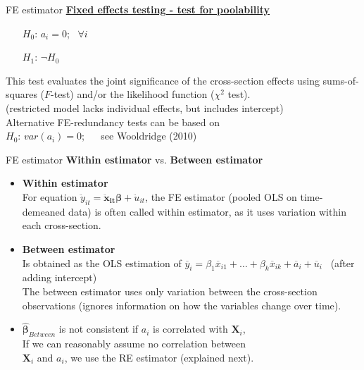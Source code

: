 \documentclass[usenames,dvipsnames]{beamer}
\begin{document}
\begin{frame}{FE estimator}
\underline{\textbf{Fixed effects testing - test for poolability}}
\begin{itemize}
\item[$H_0$:] $a_i = 0$; \ $\forall i$
\item[$H_1$:] $\neg H_0$
\end{itemize}
\medskip
This test evaluates the joint significance of the cross-section effects using sums-of-squares ($F$-test) and/or the likelihood function ($\chi^2$ test). \\
\medskip
(restricted model lacks individual effects, but includes intercept) \\
\medskip
Alternative FE-redundancy tests can be based on \\$H_0$: $\textit{var}(a_i) = 0$; ~~
see Wooldridge (2010)
\end{frame}
\begin{frame}{FE estimator}
\textbf{Within estimator} vs. \textbf{Between estimator}
\medskip
\begin{itemize}
\item \textbf{Within estimator}\\
For equation  $\ddot{y}_{it} = \bm{\ddot{x}_{it} \beta} + \ddot{u}_{it}$, the FE estimator (pooled OLS on time-demeaned data) is often called within estimator, as it uses variation within each cross-section.
\item \textbf{Between estimator}\\
Is obtained as the OLS estimation of $\overline{y}_i = \beta_1 \overline{x}_{i1} + \dots + \beta_k \overline{x}_{ik} + \overline{a}_i + \overline{u}_i$ \ (after adding intercept)\\
\medskip
The between estimator uses only variation between the cross-section observations (ignores information on how the variables change over time).\\
\medskip
\item $\bm{\hat{\beta}}_{\textit{Between}}$ is not consistent if $a_i$ is correlated with $\bm{X}_i$, \\If we can reasonably assume no correlation between \\$\bm{X}_i$ and $a_i$, we use the RE estimator (explained next). 
\end{itemize}
\end{frame}
\end{document}
